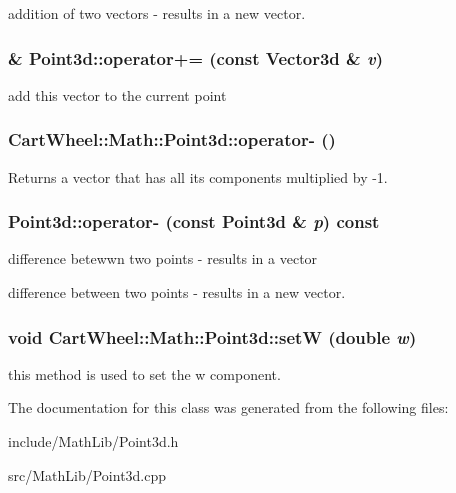 addition of two vectors -\/ results in a new vector. \hypertarget{classCartWheel_1_1Math_1_1Point3d_a83f481c82ffbed5b3c4f9842ca9ea543}{
\subsubsection[{operator+=}]{ \& Point3d::operator+= (const {\bf Vector3d} \& {\em v})}}
\label{classCartWheel_1_1Math_1_1Point3d_a83f481c82ffbed5b3c4f9842ca9ea543}
add this vector to the current point \hypertarget{classCartWheel_1_1Math_1_1Point3d_a4e4c20ab010c596512991eedd7b52833}{
\subsubsection[{operator-\/}]{ CartWheel::Math::Point3d::operator-\/ ()}}
\label{classCartWheel_1_1Math_1_1Point3d_a4e4c20ab010c596512991eedd7b52833}
Returns a vector that has all its components multiplied by -\/1. \hypertarget{classCartWheel_1_1Math_1_1Point3d_a6a8d74986ba3e2e1a30632d0d8e981fb}{
\subsubsection[{operator-\/}]{ Point3d::operator-\/ (const {\bf Point3d} \& {\em p}) const}}
\label{classCartWheel_1_1Math_1_1Point3d_a6a8d74986ba3e2e1a30632d0d8e981fb}
difference betewwn two points -\/ results in a vector

difference between two points -\/ results in a new vector. \hypertarget{classCartWheel_1_1Math_1_1Point3d_ae5925e6a4a4b3b90f30610191e89c863}{
\subsubsection[{setW}]{\setlength{\rightskip}{0pt plus 5cm}void CartWheel::Math::Point3d::setW (double {\em w})}}
\label{classCartWheel_1_1Math_1_1Point3d_ae5925e6a4a4b3b90f30610191e89c863}
this method is used to set the w component. 

The documentation for this class was generated from the following files:\begin{DoxyCompactItemize}
\item 
include/MathLib/Point3d.h\item 
src/MathLib/Point3d.cpp\end{DoxyCompactItemize}
